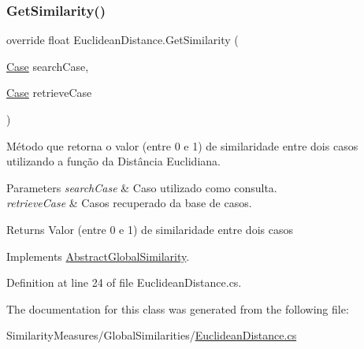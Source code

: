 \subsubsection{\texorpdfstring{Get\+Similarity()}{GetSimilarity()}}
{\footnotesize\ttfamily override float Euclidean\+Distance.\+Get\+Similarity (\begin{DoxyParamCaption}\item[{\hyperlink{class_case}{Case}}]{search\+Case,  }\item[{\hyperlink{class_case}{Case}}]{retrieve\+Case }\end{DoxyParamCaption})\hspace{0.3cm}{\ttfamily [virtual]}}



Método que retorna o valor (entre 0 e 1) de similaridade entre dois casos utilizando a função da Distância Euclidiana. 


\begin{DoxyParams}{Parameters}
{\em search\+Case} & Caso utilizado como consulta.\\
\hline
{\em retrieve\+Case} & Casos recuperado da base de casos.\\
\hline
\end{DoxyParams}
\begin{DoxyReturn}{Returns}
Valor (entre 0 e 1) de similaridade entre dois casos
\end{DoxyReturn}


Implements \hyperlink{class_abstract_global_similarity_a4b97677ae2f5a0bdee41019b40b45114}{Abstract\+Global\+Similarity}.



Definition at line 24 of file Euclidean\+Distance.\+cs.



The documentation for this class was generated from the following file\+:\begin{DoxyCompactItemize}
\item 
Similarity\+Measures/\+Global\+Similarities/\hyperlink{_euclidean_distance_8cs}{Euclidean\+Distance.\+cs}\end{DoxyCompactItemize}
